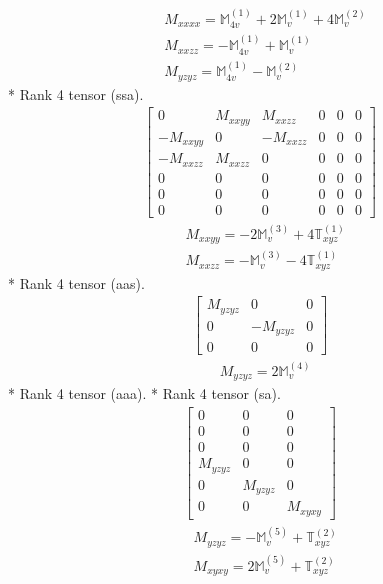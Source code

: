 \documentclass[fleqn,8pt,landscape]{jsarticle}
\begin{document}
\begin{align*}
& M_{xxxx} = \mathbb{M}_{4v}^{(1)} + 2 \mathbb{M}_{v}^{(1)} + 4 \mathbb{M}_{v}^{(2)} \\
& M_{xxzz} = - \mathbb{M}_{4v}^{(1)} + \mathbb{M}_{v}^{(1)} \\
& M_{yzyz} = \mathbb{M}_{4v}^{(1)} - \mathbb{M}_{v}^{(2)}
\end{align*}
* Rank 4 tensor (ssa).
\begin{align*}
\begin{bmatrix} 0 & M_{xxyy} & M_{xxzz} & 0 & 0 & 0 \\ - M_{xxyy} & 0 & - M_{xxzz} & 0 & 0 & 0 \\ - M_{xxzz} & M_{xxzz} & 0 & 0 & 0 & 0 \\ 0 & 0 & 0 & 0 & 0 & 0 \\ 0 & 0 & 0 & 0 & 0 & 0 \\ 0 & 0 & 0 & 0 & 0 & 0 \end{bmatrix}
\end{align*}
\begin{align*}
& M_{xxyy} = - 2 \mathbb{M}_{v}^{(3)} + 4 \mathbb{T}_{xyz}^{(1)} \\
& M_{xxzz} = - \mathbb{M}_{v}^{(3)} - 4 \mathbb{T}_{xyz}^{(1)}
\end{align*}
* Rank 4 tensor (aas).
\begin{align*}
\begin{bmatrix} M_{yzyz} & 0 & 0 \\ 0 & - M_{yzyz} & 0 \\ 0 & 0 & 0 \end{bmatrix}
\end{align*}
\begin{align*}
& M_{yzyz} = 2 \mathbb{M}_{v}^{(4)}
\end{align*}
* Rank 4 tensor (aaa).
* Rank 4 tensor (sa).
\begin{align*}
\begin{bmatrix} 0 & 0 & 0 \\ 0 & 0 & 0 \\ 0 & 0 & 0 \\ M_{yzyz} & 0 & 0 \\ 0 & M_{yzyz} & 0 \\ 0 & 0 & M_{xyxy} \end{bmatrix}
\end{align*}
\begin{align*}
& M_{yzyz} = - \mathbb{M}_{v}^{(5)} + \mathbb{T}_{xyz}^{(2)} \\
& M_{xyxy} = 2 \mathbb{M}_{v}^{(5)} + \mathbb{T}_{xyz}^{(2)}
\end{align*}
\end{document}
